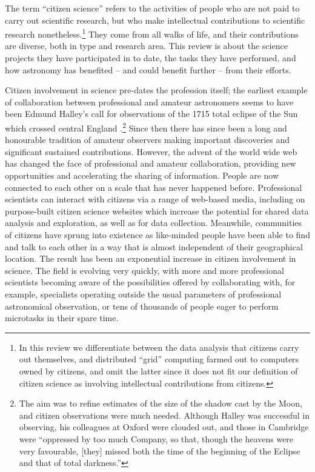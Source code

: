 \documentclass{ar2e}
\begin{document}
The term ``citizen science'' refers to the activities of people who are not paid
to carry out scientific research, but who make intellectual contributions to
scientific research nonetheless.\footnote{In this review we differentiate
between the data analysis that citizens carry out themselves, and  distributed
``grid'' computing farmed out to computers owned by citizens, and omit the
latter since it does not fit our definition of citizen science as involving
intellectual  contributions from citizens.} They come from all walks of life,
and their contributions are diverse, both in type and research area. This review
is about the science projects they have participated in to date, the tasks they
have performed, and how astronomy has benefited -- and could benefit further --
from their efforts.

Citizen involvement in science pre-dates the profession itself; the earliest
example of collaboration between professional and amateur astronomers seems to
have been Edmund Halley's call for observations of the 1715 total eclipse of the
Sun which crossed central England \citep{Halley}.\footnote{The aim was to refine
estimates of the size of the shadow cast by the Moon, and citizen observations
were much needed. Although Halley was successful in observing, his colleagues at
Oxford were clouded out, and those in Cambridge were ``oppressed by too much
Company, so that, though the heavens were very favourable, [they] missed both
the time of the beginning of the Eclipse and that of total darkness.''}  Since
then there has since been a long and honourable tradition of amateur observers
making important discoveries and significant sustained contributions. However,
the advent of the world wide web has changed the face of professional and
amateur collaboration, providing new opportunities and accelerating the sharing
of information. People are now connected to each other on a scale that has never
happened before. Professional scientists can interact with citizens via a range
of web-based media, including on purpose-built citizen science websites which
increase the potential for shared data analysis and exploration, as well as for
data collection. Meanwhile, communities of citizens have sprung into existence
as like-minded people have been able to find and talk to each other in a way
that is almost independent of their geographical location. The result has been
an exponential increase in citizen involvement in science. The field is evolving
very quickly, with more and more professional scientists becoming aware of the
possibilities offered by collaborating with, for example, specialists operating
outside the usual parameters of professional astronomical observation, or tens
of thousands of people eager to perform microtasks in their spare time.  
\end{document}
